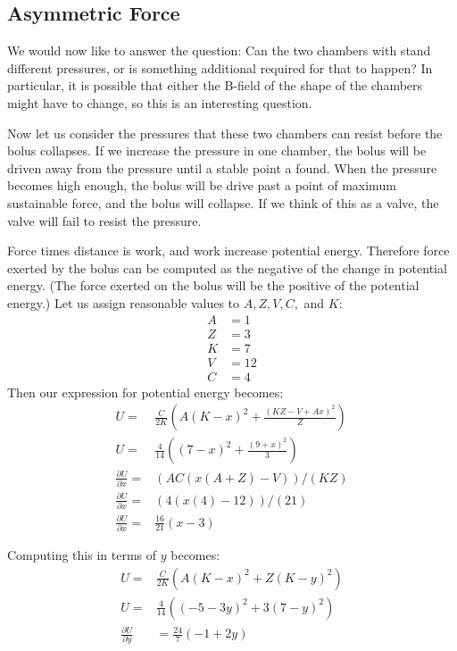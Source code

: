 \documentclass{asme2ej}
\begin{document}
\subsection{Asymmetric Force}

We would now like to answer the question: Can the two chambers with stand
different pressures, or is something additional required for that to happen?
In particular, it is possible that either the B-field of the shape of the chambers
might have to change, so this is an interesting question.

Now let us consider the pressures that these two chambers can resist before
the bolus collapses. If we increase the pressure in one chamber, the
bolus will be driven away from the pressure until a stable point a found.
When the pressure becomes high enough, the bolus will be drive past a point
of maximum sustainable force, and the bolus will collapse. If we think
of this as a valve, the valve will fail to resist the pressure.

Force times distance is work, and work increase potential energy.
Therefore force exerted by the bolus can be computed as the negative of the change in potential energy.
(The force exerted on the bolus will be the positive of the potential energy.)
Let us assign reasonable values to $A,Z,V,C,$ and $K$:
\begin{align}
  A &= 1 \\
  Z &= 3 \\
  K &= 7 \\
  V &= 12 \\
  C &= 4
\end{align}
Then our expression for potential energy becomes:
\begin{align}
  U = &\frac{C}{2K} \left( A  (K - x)^2 + \frac{(K Z - V + A x)^2}{Z} \right) \\
  U = &\frac{4}{14} \left(   (7 - x)^2 + \frac{(9 +  x)^2}{3} \right) \\
  \frac{\partial U}{\partial x} = &(A C (x (A + Z) - V))/(K Z) \\
  \frac{\partial U}{\partial x} = & (4 (x (4) - 12))/(21) \\
  \frac{\partial U}{\partial x} = & \frac{16}{21} (x - 3)
\end{align}

Computing this in terms of $y$ becomes:
\begin{align}
  U = & \frac{C}{2K} \left( A  (K - x)^2 + Z (K - y)^2 \right) \\
  U = & \frac{4}{14} \left(   (-5 - 3y)^2 + 3 (7 - y)^2 \right) \\
  \frac{\partial U}{\partial y} &= \frac{24}{7} (-1 + 2 y)
  \end{align}
\end{document}
